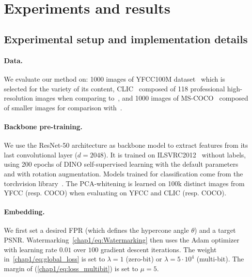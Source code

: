 \newcommand{\rot}[1]{\rotatebox{60}{#1}}%

\section{Experiments and results}
\label{chap1/sec:experiments}

\subsection{Experimental setup and implementation details}\label{chap1/sec:exp_setup}

\paragraph*{Data.}
We evaluate our method on: 
1000 images of YFCC100M dataset~\citep{thomee2016yfcc100m} which is selected for the variety of its content, CLIC~\citep{2018clic} composed of 118 professional high-resolution images when comparing to~\citep{vukotic2020classification}, and 1000 images of MS-COCO~\citep{lin2014coco} composed of smaller images for comparison with~\citep{zhu2018hidden,luo2020distortion}.

\paragraph*{Backbone pre-training.}\label{chap1/par:backbone_pretraining} 
We use the ResNet-50 \citep{he2016deep} architecture as backbone model to extract features from its last convolutional layer ($d=2048$).
It is trained on ILSVRC2012~\citep{deng2009imagenet} without labels, using 200 epochs of DINO self-supervised learning with the default parameters~\citep{caron2021dino} and with rotation augmentation.
Models trained for classification come from the torchvision library~\citep{marcel2010torchvision}. 
The PCA-whitening is learned on 100k distinct images from YFCC (resp. COCO) when evaluating on YFCC and CLIC (resp. COCO).

\paragraph*{Embedding.}
We first set a desired FPR (which defines the hypercone angle $\theta$) and a target PSNR.
Watermarking~\eqref{chap1/eq:Watermarking} then uses the Adam optimizer~\citep{kingma2015adam} with learning rate $0.01$ over $100$ gradient descent iterations.
The weight in~\eqref{chap1/eq:global_loss} is set to $\lambda=1$ (zero-bit) or $\lambda=5\cdot 10^4$ (multi-bit). 
The margin of (\ref{chap1/eq:loss_multibit}) is set to $\mu=5$.

